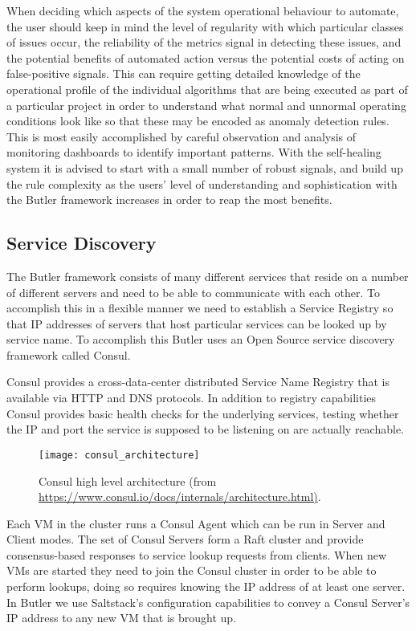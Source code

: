 When deciding which aspects of the system operational behaviour to automate, the user should keep in mind the level of regularity with which particular classes of issues occur, the reliability of the metrics signal in detecting these issues, and the potential benefits of automated action versus the potential costs of acting on false-positive signals. This can require getting detailed knowledge of the operational profile of the individual algorithms that are being executed as part of a particular project in order to understand what normal and unnormal operating conditions look like so that these may be encoded as anomaly detection rules. This is most easily accomplished by careful observation and analysis of monitoring dashboards to identify important patterns. With the self-healing system it is advised to start with a small number of robust signals, and build up the rule complexity as the users' level of understanding and sophistication with the Butler framework increases in order to reap the most benefits.

\subsection{Service Discovery} 
\label{sec:design_consul}

The Butler framework consists of many different services that reside on a number of different servers and need to be able to communicate with each other. To accomplish this in a flexible manner we need to establish a Service Registry so that IP addresses of servers that host particular services can be looked up by service name. To accomplish this Butler uses an Open Source service discovery framework called Consul\autocite{Consul_by_HashiCorp}.

Consul provides a cross-data-center distributed Service Name Registry that is available via HTTP and DNS protocols. In addition to registry capabilities Consul provides basic health checks for the underlying services, testing whether the IP and port the service is supposed to be listening on are actually reachable.

\begin{figure}[h]
\texttt{[image: consul\_architecture]}
\centering
\caption {Consul high level architecture (from \url{https://www.consul.io/docs/internals/architecture.html)}.}
\label{fig:consul_architecture}
\end{figure} 

Each VM in the cluster runs a Consul Agent which can be run in Server and Client modes. The set of Consul Servers form a Raft cluster and provide consensus-based responses to service lookup requests from clients. When new VMs are started they need to join the Consul cluster in order to be able to perform lookups, doing so requires knowing the IP address of at least one server. In Butler we use Saltstack's configuration capabilities to convey a Consul Server's IP address to any new VM that is brought up. 

